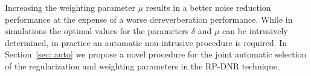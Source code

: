 \documentclass{aes60i}
\begin{document}
Increasing the weighting parameter $\mu$ results in a better noise reduction performance at the expense of a worse dereverberation performance.
While in simulations the optimal values for the parameters $\delta$ and $\mu$ can be intrusively determined, in practice an automatic non-intrusive procedure is required.
In Section~\ref{sec: auto} we propose a novel procedure for the joint automatic selection of the regularization and weighting parameters in the RP-DNR technique.
\end{document}
